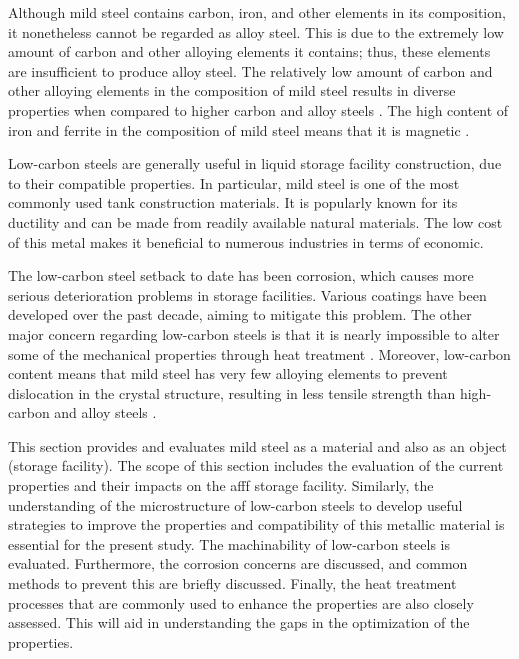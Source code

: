 Although mild steel contains carbon, iron, and other elements in its composition, it nonetheless cannot be regarded as alloy steel. This is due to the extremely low amount of carbon and other alloying elements it contains; thus, these elements are insufficient to produce alloy steel. The relatively low amount of carbon and other alloying elements in the composition of mild steel results in diverse properties when compared to higher carbon and alloy steels \cite{timings2008fabrication}. The high content of iron and ferrite in the composition of mild steel means that it is magnetic \cite{li2018effect}.

Low-carbon steels are generally useful in liquid storage facility construction, due to their compatible properties. In particular, mild steel is one of the most commonly used tank construction materials. It is popularly known for its ductility and can be made from readily available natural materials. The low cost of this metal makes it beneficial to numerous industries in terms of economic.

The low-carbon steel setback to date has been corrosion, which causes more serious deterioration problems in storage facilities\cite{erami2019carboxamide}. Various coatings have been developed over the past decade, aiming to mitigate this problem. The other major concern regarding low-carbon steels is that it is nearly impossible to alter some of the mechanical properties through heat treatment \cite{callister2018materials}. Moreover, low-carbon content means that mild steel has very few alloying elements to prevent dislocation in the crystal structure, resulting in less tensile strength than high-carbon and alloy steels \cite{callister2018materials}.

This section provides and evaluates mild steel as a material and also as an object (storage facility). The scope of this section includes the evaluation of the current properties and their impacts on the \acrshort{afff} storage facility. Similarly, the understanding of the microstructure of low-carbon steels to develop useful strategies to improve the properties and compatibility of this metallic material is essential for the present study. The machinability of low-carbon steels is evaluated. Furthermore, the corrosion concerns are discussed, and common methods to prevent this are briefly discussed. Finally, the heat treatment processes that are commonly used to enhance the properties are also closely assessed. This will aid in understanding the gaps in the optimization of the properties.

